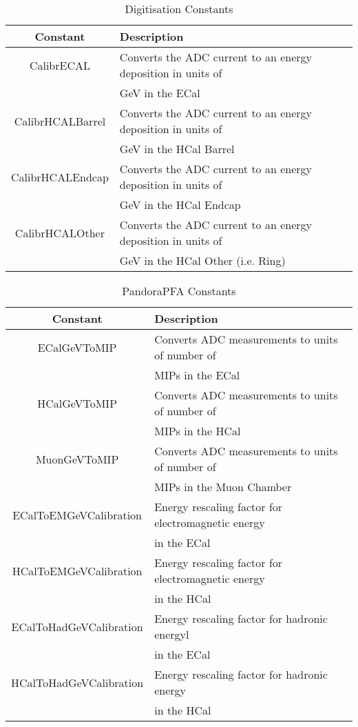 \documentclass[11pt, oneside]{article}   	%
\begin{document}
\begin{table}[htdp]
\caption{Digitisation Constants}
\begin{center}
\begin{tabular}{|c|l|}
\hline
Constant & Description \\
\hline
CalibrECAL 		& Converts the ADC current to an energy deposition in units of \\
                    		& GeV in the ECal \\
CalibrHCALBarrel 	& Converts the ADC current to an energy deposition in units of \\
                    		& GeV in the HCal Barrel \\
CalibrHCALEndcap 	& Converts the ADC current to an energy deposition in units of \\
                   		& GeV in the HCal Endcap\\
CalibrHCALOther 	& Converts the ADC current to an energy deposition in units of \\
                    		& GeV in the HCal Other (i.e. Ring) \\
\hline
\end{tabular}
\end{center}
\label{table1}
\end{table}%

\begin{table}[htdp]
\caption{PandoraPFA Constants}
\begin{center}
\begin{tabular}{|c|l|}
\hline
Constant & Description \\
\hline
ECalGeVToMIP 			& Converts ADC measurements to units of number of\\
			 			& MIPs in the ECal\\
HCalGeVToMIP 			& Converts ADC measurements to units of number of\\
			 			& MIPs in the HCal\\
MuonGeVToMIP 			& Converts ADC measurements to units of number of\\
			 			& MIPs in the Muon Chamber\\
ECalToEMGeVCalibration 	& Energy rescaling factor for electromagnetic energy\\
					 	& in the ECal \\
HCalToEMGeVCalibration 	& Energy rescaling factor for electromagnetic energy\\
					 	& in the HCal \\
ECalToHadGeVCalibration 	& Energy rescaling factor for hadronic energyl\\
					 	& in the ECal \\
HCalToHadGeVCalibration 	& Energy rescaling factor for hadronic energy\\
					 	& in the HCal \\
\hline
\end{tabular}
\end{center}
\label{table2}
\end{table}%
\end{document}
